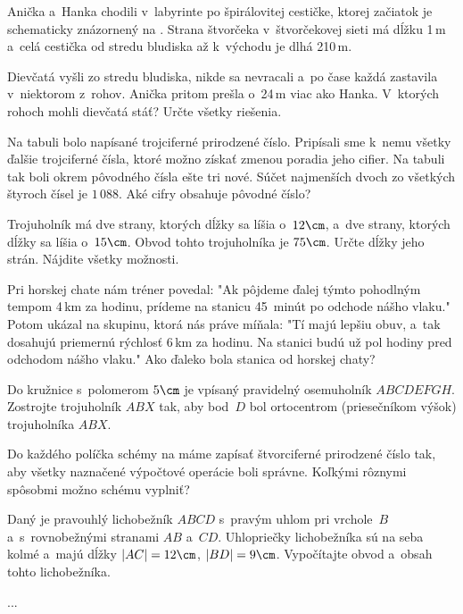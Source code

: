 {%
Anička a~Hanka chodili v~labyrinte po špirálovitej cestičke, ktorej
začiatok je schematicky znázornený na \obr{}.
Strana štvorčeka v~štvorčekovej sieti má dĺžku 1\,m a~celá cestička od stredu
bludiska až k~východu je dlhá 210\,m.
%

\noindent
Dievčatá vyšli zo stredu bludiska,
nikde sa nevracali a~po čase každá zastavila v~niektorom z~rohov.
Anička pritom prešla o~24\,m viac ako Hanka.
V~ktorých rohoch mohli dievčatá stáť?
Určte všetky riešenia.}

{%
Na tabuli bolo napísané trojciferné prirodzené číslo.
Pripísali sme k~nemu všetky ďalšie trojciferné čísla, ktoré možno získať zmenou
poradia jeho cifier.
Na tabuli tak boli okrem pôvodného čísla ešte tri nové.
Súčet najmenších dvoch zo všetkých štyroch čísel je $1\,088$.
Aké cifry obsahuje pôvodné číslo?}

{%
Trojuholník má dve strany, ktorých dĺžky sa líšia o~$12\cm$, a~dve strany,
ktorých dĺžky sa líšia o~$15\cm$.
Obvod tohto trojuholníka je $75\cm$.
Určte dĺžky jeho strán. Nájdite všetky možnosti.}

{%
Pri horskej chate nám tréner povedal:
"Ak pôjdeme ďalej týmto pohodlným tempom 4\,km za hodinu, prídeme na stanicu
45~minút po odchode nášho vlaku."
Potom ukázal na skupinu, ktorá nás práve míňala:
"Tí majú lepšiu obuv, a~tak dosahujú priemernú rýchlosť 6\,km za hodinu. Na
stanici budú už pol hodiny pred odchodom nášho vlaku."
Ako ďaleko bola stanica od horskej chaty?}

{%
Do kružnice s~polomerom $5\cm$ je vpísaný pravidelný osemuholník $ABCDEFGH$.
Zostrojte trojuholník $ABX$ tak, aby
bod~$D$ bol ortocentrom (priesečníkom výšok) trojuholníka $ABX$.}

{%
Do každého políčka schémy na \obr{} máme zapísať štvorciferné prirodzené
číslo tak, aby všetky naznačené výpočtové operácie boli správne.
Koľkými rôznymi spôsobmi možno schému vyplniť?
%
}

{%
Daný je pravouhlý lichobežník $ABCD$ s~pravým uhlom pri vrchole~$B$
a~s~rovnobežnými stranami $AB$ a~$CD$.
Uhlopriečky lichobežníka sú na seba kolmé a~majú dĺžky $|AC|=12\cm$, $|BD|=9\cm$.
Vypočítajte obvod a~obsah tohto lichobežníka.}

{%
...}

